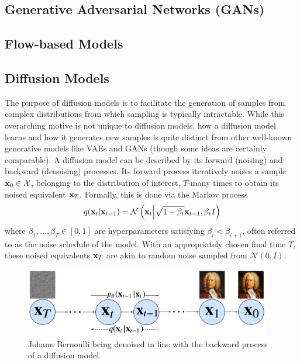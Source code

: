 \documentclass[11pt]{article}
\begin{document}
\subsection{Generative Adversarial Networks (GANs)}
\TODO{}

\subsection{Flow-based Models}
\TODO{}

\subsection{Diffusion Models}
\TODO{} The purpose of diffusion models is to facilitate the generation of samples from complex distributions from which sampling is typically intractable. While this overarching motive is not unique to diffusion models, how a diffusion model learns and how it generates new samples is quite distinct from other well-known generative models like VAEs and GANs (though some ideas are certainly comparable). A diffusion model can be described by its forward (noising) and backward (denoising) processes. Its forward process iteratively noises a sample $\mathbf{x}_0\in\mathcal{X}$, belonging to the distribution of interest, $T$-many times to obtain its noised equivalent $\mathbf{x}_T$. Formally, this is done via the Markov process
$$
q(\mathbf{x}_t|\mathbf{x}_{t-1})
=
\mathcal{N}\left(\mathbf{x}_t\Big|\sqrt{1-\beta_t}\mathbf{x}_{t-1},\beta_tI\right)
$$
where $\beta_1,\dots,\beta_T\in[0,1]$ are hyperparameters satisfying $\beta_i<\beta_{i+1}$, often referred to as the noise schedule of the model. With an appropriately chosen final time $T$, these noised equivalents $\mathbf{x}_T$ are akin to random noise sampled from $\mathcal{N}(0,I)$.

\begin{figure}[t]
    \centering
    \includegraphics[height=3cm]{./figures/generative_models/diffusion_process.pdf}
    \caption{Johann Bernoulli being denoised in line with the backward process of a diffusion model. }
    \label{fig:diffusion_process}
\end{figure}
\end{document}
